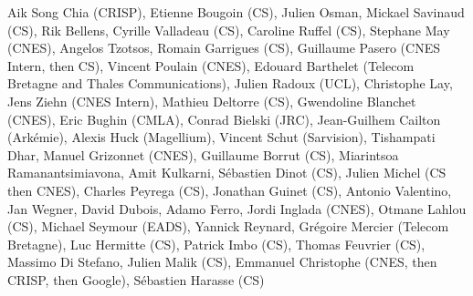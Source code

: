 Aik Song Chia (CRISP), Etienne Bougoin (CS), Julien Osman, Mickael Savinaud (CS), Rik Bellens, Cyrille Valladeau (CS), Caroline Ruffel (CS), Stephane May (CNES), Angelos Tzotsos, Romain Garrigues (CS), Guillaume Pasero (CNES Intern, then CS), Vincent Poulain (CNES), Edouard Barthelet (Telecom Bretagne and Thales Communications), Julien Radoux (UCL), Christophe Lay, Jens Ziehn (CNES Intern), Mathieu Deltorre (CS), Gwendoline Blanchet (CNES), Eric Bughin (CMLA), Conrad Bielski (JRC), Jean-Guilhem Cailton (Ark\'emie), Alexis Huck (Magellium), Vincent Schut (Sarvision), Tishampati Dhar, Manuel Grizonnet (CNES), Guillaume Borrut (CS), Miarintsoa Ramanantsimiavona, Amit Kulkarni, S\'ebastien Dinot (CS), Julien Michel (CS then CNES), Charles Peyrega (CS), Jonathan Guinet (CS), Antonio Valentino, Jan Wegner, David Dubois, Adamo Ferro, Jordi Inglada (CNES), Otmane Lahlou (CS), Michael Seymour (EADS), Yannick Reynard, Gr\'egoire Mercier (Telecom Bretagne), Luc Hermitte (CS), Patrick Imbo (CS), Thomas Feuvrier (CS), Massimo Di Stefano, Julien Malik (CS), Emmanuel Christophe (CNES, then CRISP, then Google), S\'ebastien Harasse (CS)